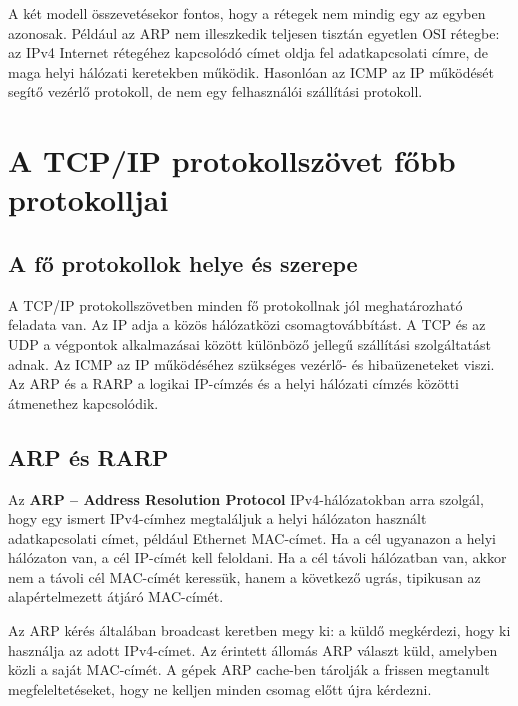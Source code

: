 A két modell összevetésekor fontos, hogy a rétegek nem mindig egy az egyben azonosak. Például az ARP nem illeszkedik teljesen tisztán egyetlen OSI rétegbe: az IPv4 Internet rétegéhez kapcsolódó címet oldja fel adatkapcsolati címre, de maga helyi hálózati keretekben működik. Hasonlóan az ICMP az IP működését segítő vezérlő protokoll, de nem egy felhasználói szállítási protokoll.

\section{A TCP/IP protokollszövet főbb protokolljai}

\subsection{A fő protokollok helye és szerepe}

A TCP/IP protokollszövetben minden fő protokollnak jól meghatározható feladata van. Az IP adja a közös hálózatközi csomagtovábbítást. A TCP és az UDP a végpontok alkalmazásai között különböző jellegű szállítási szolgáltatást adnak. Az ICMP az IP működéséhez szükséges vezérlő- és hibaüzeneteket viszi. Az ARP és a RARP a logikai IP-címzés és a helyi hálózati címzés közötti átmenethez kapcsolódik.

\begin{center}

\end{center}

\subsection{ARP és RARP}

Az \textbf{ARP -- Address Resolution Protocol} IPv4-hálózatokban arra szolgál, hogy egy ismert IPv4-címhez megtaláljuk a helyi hálózaton használt adatkapcsolati címet, például Ethernet MAC-címet. Ha a cél ugyanazon a helyi hálózaton van, a cél IP-címét kell feloldani. Ha a cél távoli hálózatban van, akkor nem a távoli cél MAC-címét keressük, hanem a következő ugrás, tipikusan az alapértelmezett átjáró MAC-címét.

Az ARP kérés általában broadcast keretben megy ki: a küldő megkérdezi, hogy ki használja az adott IPv4-címet. Az érintett állomás ARP választ küld, amelyben közli a saját MAC-címét. A gépek ARP cache-ben tárolják a frissen megtanult megfeleltetéseket, hogy ne kelljen minden csomag előtt újra kérdezni.



